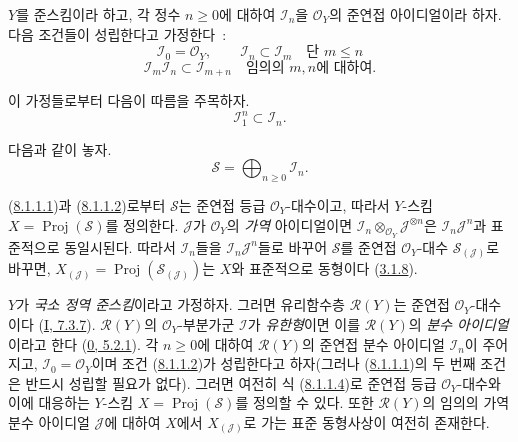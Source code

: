 \begin{env}[8.1.1]
\label{II.8.1.1-ko}
$Y$를 준스킴이라 하고, 각 정수 $n\geq0$에 대하여 $\mathcal{I}_n$을
$\mathcal{O}_Y$의 준연접 아이디얼이라 하자. 다음 조건들이 성립한다고
가정한다~:
\begin{equation}
\label{II.8.1.1.1-ko}
  \mathcal{I}_0=\mathcal{O}_Y,\qquad
  \mathcal{I}_n\subset\mathcal{I}_m\quad\text{단 }m\leq n
\tag{8.1.1.1}
\end{equation}
\begin{equation}
\label{II.8.1.1.2-ko}
  \mathcal{I}_m\mathcal{I}_n\subset\mathcal{I}_{m+n}
  \quad\text{임의의 }m,n\text{에 대하여}.
\tag{8.1.1.2}
\end{equation}

이 가정들로부터 다음이 따름을 주목하자.
\begin{equation}
\label{II.8.1.1.3-ko}
  \mathcal{I}_1^n\subset\mathcal{I}_n.
\tag{8.1.1.3}
\end{equation}

다음과 같이 놓자.
\begin{equation}
\label{II.8.1.1.4-ko}
  \mathcal{S}=\bigoplus_{n\geq0}\mathcal{I}_n.
\tag{8.1.1.4}
\end{equation}

(\hyperref[II.8.1.1.1-ko]{8.1.1.1})과
(\hyperref[II.8.1.1.2-ko]{8.1.1.2})로부터 $\mathcal{S}$는 준연접 등급
$\mathcal{O}_Y$-대수이고, 따라서 $Y$-스킴
$X=\operatorname{Proj}(\mathcal{S})$를 정의한다. $\mathcal{J}$가
$\mathcal{O}_Y$의 \emph{가역} 아이디얼이면
$\mathcal{I}_n\otimes_{\mathcal{O}_Y}\mathcal{J}^{\otimes n}$은
$\mathcal{I}_n\mathcal{J}^n$과 표준적으로 동일시된다. 따라서
$\mathcal{I}_n$들을 $\mathcal{I}_n\mathcal{J}^n$들로 바꾸어
$\mathcal{S}$를 준연접 $\mathcal{O}_Y$-대수
$\mathcal{S}_{(\mathcal{J})}$로 바꾸면,
$X_{(\mathcal{J})}=\operatorname{Proj}(\mathcal{S}_{(\mathcal{J})})$는
$X$와 표준적으로 동형이다 (\hyperref[II.3.1.8-ko]{3.1.8}).
\end{env}

\begin{env}[8.1.2]
\label{II.8.1.2-ko}
$Y$가 \emph{국소 정역 준스킴}이라고 가정하자. 그러면 유리함수층
$\mathcal{R}(Y)$는 준연접 $\mathcal{O}_Y$-대수이다
(\hyperref[I.7.3.7-ko]{I, 7.3.7}). $\mathcal{R}(Y)$의
$\mathcal{O}_Y$-부분가군 $\mathcal{I}$가 \emph{유한형}이면 이를
$\mathcal{R}(Y)$의 \emph{분수 아이디얼}이라고 한다
(\hyperref[0.5.2.1-ko]{0, 5.2.1}). 각 $n\geq0$에 대하여
$\mathcal{R}(Y)$의 준연접 분수 아이디얼 $\mathcal{I}_n$이 주어지고,
$\mathcal{I}_0=\mathcal{O}_Y$이며 조건
(\hyperref[II.8.1.1.2-ko]{8.1.1.2})가 성립한다고 하자(그러나
(\hyperref[II.8.1.1.1-ko]{8.1.1.1})의 두 번째 조건은 반드시 성립할
필요가 없다). 그러면 여전히 식 (\hyperref[II.8.1.1.4-ko]{8.1.1.4})로
준연접 등급 $\mathcal{O}_Y$-대수와 이에 대응하는 $Y$-스킴
$X=\operatorname{Proj}(\mathcal{S})$를 정의할 수 있다. 또한
$\mathcal{R}(Y)$의 임의의 가역 분수 아이디얼 $\mathcal{J}$에 대하여
$X$에서 $X_{(\mathcal{J})}$로 가는 표준 동형사상이 여전히 존재한다.
\end{env}

